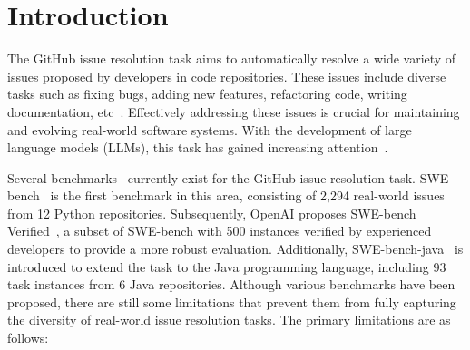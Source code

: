 \section{Introduction}

The GitHub issue resolution task aims to automatically resolve a wide variety of issues proposed by developers in code repositories. These issues include diverse tasks such as fixing bugs, adding new features, refactoring code, writing documentation, etc~\cite{BissyandeLJRKT13,TaoZWZWZ24}. Effectively addressing these issues is crucial for maintaining and evolving real-world software systems. With the development of large language models (LLMs), 
this task has gained increasing attention~\cite{xia2024agentless,liu2024marscode,tao2024magis,yang2024swe,chen2024coder,zhang2024autocoderover,arora2024masai,wang2024opendevin,ma2024understand}.

Several benchmarks~\cite{zan2024swe,jimenez2023swe,openai2024swe,aleithan2024sweplus} currently exist for the GitHub issue resolution task. SWE-bench~\cite{jimenez2023swe} is the first benchmark in this area, consisting of 2,294 real-world issues from 12 Python repositories. Subsequently, OpenAI proposes SWE-bench Verified~\cite{openai2024swe}, a subset of SWE-bench with 500 instances verified by experienced developers to provide a more robust evaluation. Additionally, SWE-bench-java~\cite{zan2024swe} is introduced to extend the task to the Java programming language, including 93 task instances from 6 Java repositories.  Although various benchmarks have been proposed, there are still some limitations that prevent them from fully capturing the diversity of real-world issue resolution tasks. The primary limitations are as follows:


